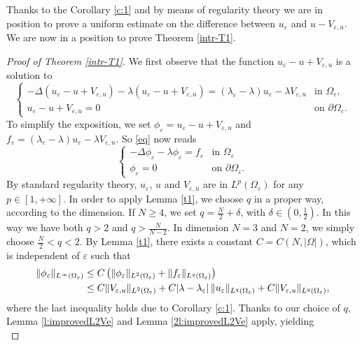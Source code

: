 \documentclass[11pt,reqno]{article}
\numberwithin{equation}{section}
\newcommand\e\varepsilon
\newcommand\la\lambda
\renewcommand\O\Omega
\begin{document}
Thanks to the Corollary \ref{c:1} and by means of regularity theory we are in position to prove a uniform estimate on the difference between $u_\e$ and $u - V_{\e,u}$. We are now in a position to prove Theorem \ref{intr-T1}.

    
\begin{proof}[Proof of Theorem \ref{intr-T1}]
We first observe that the function $u_\e-u+V_{\e,u}$ is a solution to
\begin{equation}\label{eq}
		\begin{cases}
				-\Delta(u_\e-u+V_{\e,u})-\la(u_\e-u+V_{\e,u})=(\la_\e-\la)u_\e-\la V_{\e,u}
				&\text{in }\Omega_\e,\\
				u_\e-u+V_{\e,u}=0 &\text{on }\partial \Omega_\e.
		\end{cases}
	\end{equation}
		To simplify the exposition, we set $\phi_\e=u_\e-u+V_{\e,u}$ and
		$f_\e=(\la_\e-\la)u_\e-\la V_{\e,u}$. So \eqref{eq} now reads
		\begin{equation}
			\begin{cases}
				-\Delta\phi_\e-\la\phi_\e=f_\e
				&\text{in }\Omega_\e\\
				\phi_\e=0 &\text{on }\partial \Omega_\e.
			\end{cases}
		\end{equation}
		By standard regularity theory, $u_\e$, $u$ and $V_{\e,u}$ are in $L^p(\Omega_\e)$ for any $p\in[1,+\infty]$. 
       In order to apply Lemma \ref{t1}, we choose $q$ in a proper way, according to the dimension. If $N\geq4$, we set $q=\frac N2 + \delta$, with $\delta\in(0,\frac12)$. In this way we have both $q>2$ and $q>\frac{N}{N-2}$. In dimension $N=3$ and $N=2$, we simply choose $\frac{N}{2}<q<2$.
        	 By Lemma \ref{t1}, there exists a constant $C=C(N,|\O|)$, which is independent of $\e$ such that 
\begin{align}\label{fi}
\|\phi_\e\|_{L^\infty(\Omega_\e)}&\le C\left(
\|\phi_\e\|_{L^2(\Omega_\e)}+\|f_\e\|_{L^q(\Omega_\e)}\right)\notag\\
&\le C\|V_{\e,u}\|_{L^2(\Omega_\e)}%
+C|\la-\la_\e|\,\|u_\e\|_{L^q(\Omega_\e)}+C\|V_{\e,u}\|_{L^q(\Omega_\e)},
		\end{align}
        where the last inequality holds due to Corollary \ref{c:1}.
		Thanks to our choice of $q$, Lemma \ref{l:improvedL2Ve} and Lemma \ref{2l:improvedL2Ve}  apply, yielding \begin{equation}

\end{equation}
\end{proof}
\end{document}
